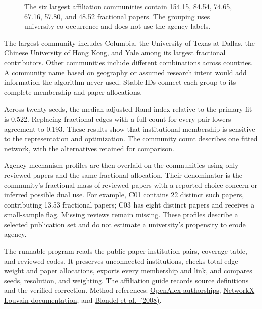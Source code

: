 \begin{figure}[htbp]
\centering

\caption{The six largest affiliation communities contain 154.15, 84.54, 74.65, 67.16, 57.80, and 48.52 fractional papers. The grouping uses university co-occurrence and does not use the agency labels.}\label{fig:M05_affiliation_communities}
\end{figure}

The largest community includes Columbia, the University of Texas at
Dallas, the Chinese University of Hong Kong, and Yale among its largest
fractional contributors. Other communities include different
combinations across countries. A community name based on geography or
assumed research intent would add information the algorithm never used.
Stable IDs connect each group to its complete membership and paper
allocations.

Across twenty seeds, the median adjusted Rand index relative to the
primary fit is 0.522. Replacing fractional edges with a full count for
every pair lowers agreement to 0.193. These results show that
institutional membership is sensitive to the representation and
optimization. The community count describes one fitted network, with the
alternatives retained for comparison.

Agency-mechanism profiles are then overlaid on the communities using
only reviewed papers and the same fractional allocation. Their
denominator is the community's fractional mass of reviewed papers with a
reported choice concern or inferred possible dual use. For example, C01
contains 22 distinct such papers, contributing 13.53 fractional papers;
C03 has eight distinct papers and receives a small-sample flag. Missing
reviews remain missing. These profiles describe a selected publication
set and do not estimate a university's propensity to erode agency.

The runnable program reads the public paper-institution pairs, coverage
table, and reviewed codes. It preserves unconnected institutions, checks
total edge weight and paper allocations, exports every membership and
link, and compares seeds, resolution, and weighting. The
\href{../03_Data_and_Code/Consumer_Agency_Literature/AFFILIATIONS.md}{affiliation
guide} records source definitions and the verified correction. Method
references: \href{https://help.openalex.org/data/authorships/}{OpenAlex
authorships},
\href{https://networkx.org/documentation/stable/reference/algorithms/generated/networkx.algorithms.community.louvain.louvain_communities.html}{NetworkX
Louvain documentation}, and
\href{https://doi.org/10.1088/1742-5468/2008/10/P10008}{Blondel et
al.~(2008)}.

